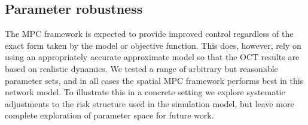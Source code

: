 \subsection{Parameter robustness}
\label{sec:ch4:Results_ParameterRobustness}

The MPC framework is expected to provide improved control regardless of the exact form taken by the model or objective function. This does, however, rely on using an appropriately accurate approximate model so that the OCT results are based on realistic dynamics. We tested a range of arbitrary but reasonable parameter sets, and in all cases the spatial MPC framework performs best in this network model. To illustrate this in a concrete setting we explore systematic adjustments to the risk structure used in the simulation model, but leave more complete exploration of parameter space for future work.

